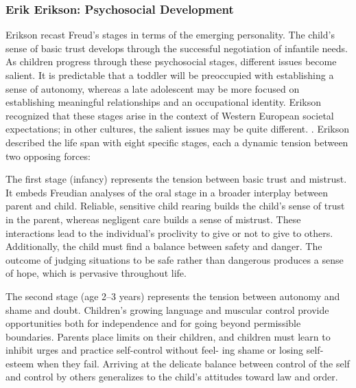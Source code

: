 \subsubsection{Erik Erikson: Psychosocial Development}
Erikson recast Freud’s stages in terms of the emerging personality. The child’s
sense of basic trust develops through the successful negotiation of infantile
needs. As children progress through these psychosocial stages, different issues
become salient. It is predictable that a toddler will be preoccupied with
establishing a sense of autonomy, whereas a late adolescent may be more focused
on establishing meaningful relationships and an occupational identity. Erikson
recognized that these stages arise in the context of Western European societal
expectations; in other cultures, the salient issues may be quite different.
\cite{Nelson19}. Erikson described the life span with eight specific stages,
each a dynamic tension between two opposing forces:

The first stage (infancy) represents the tension between basic trust and
mistrust. It embeds Freudian analyses of the oral stage in a broader interplay
between parent and child. Reliable, sensitive child rearing builds the child’s
sense of trust in the parent, whereas negligent care builds a sense of
mistrust. These interactions lead to the individual’s proclivity to give or not
to give to others. Additionally, the child must find a balance between safety
and danger. The outcome of judging situations to be safe rather than dangerous
produces a sense of hope, which is pervasive throughout life. \cite{Feldman3}

The second stage (age 2–3 years) represents the tension between autonomy and
shame and doubt. Children’s growing language and muscular control provide
opportunities both for independence and for going beyond permissible
boundaries. Parents place limits on their children, and children must learn to
inhibit urges and practice self-control without feel- ing shame or losing
self-esteem when they fail. Arriving at the delicate balance between control of
the self and control by others generalizes to the child’s attitudes toward law
and order. \cite{Feldman3}

